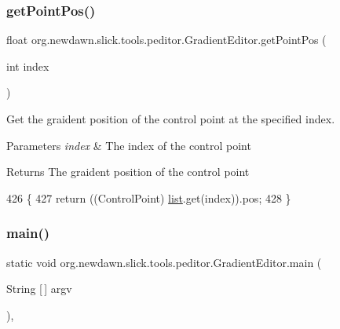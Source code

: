 \subsubsection{\texorpdfstring{get\+Point\+Pos()}{getPointPos()}}
{\footnotesize\ttfamily float org.\+newdawn.\+slick.\+tools.\+peditor.\+Gradient\+Editor.\+get\+Point\+Pos (\begin{DoxyParamCaption}\item[{int}]{index }\end{DoxyParamCaption})\hspace{0.3cm}{\ttfamily [inline]}}

Get the graident position of the control point at the specified index.


\begin{DoxyParams}{Parameters}
{\em index} & The index of the control point \\
\hline
\end{DoxyParams}
\begin{DoxyReturn}{Returns}
The graident position of the control point 
\end{DoxyReturn}

\begin{DoxyCode}
426                                         \{
427         \textcolor{keywordflow}{return} ((ControlPoint) \mbox{\hyperlink{classorg_1_1newdawn_1_1slick_1_1tools_1_1peditor_1_1_gradient_editor_aa53704ef8438035eb76c8c6aab8af133}{list}}.get(index)).pos;
428     \}
\end{DoxyCode}
\mbox{\label{classorg_1_1newdawn_1_1slick_1_1tools_1_1peditor_1_1_gradient_editor_aa02e60ceb1decda1145b78a28fb2d29b}} 
\subsubsection{\texorpdfstring{main()}{main()}}
{\footnotesize\ttfamily static void org.\+newdawn.\+slick.\+tools.\+peditor.\+Gradient\+Editor.\+main (\begin{DoxyParamCaption}\item[{String \mbox{[}$\,$\mbox{]}}]{argv }\end{DoxyParamCaption})\hspace{0.3cm}{\ttfamily [inline]}, {\ttfamily [static]}}

